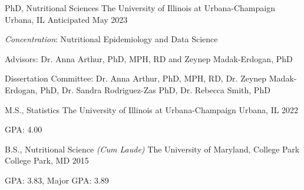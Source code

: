 

\begin{cventries}

  \cventry
    {PhD, Nutritional Sciences} %
    {The University of Illinois at Urbana-Champaign} %
    {Urbana, IL} %
    {Anticipated May 2023} %
    {
      \begin{cvitems} %
        \item {\textit{Concentration}: Nutritional Epidemiology and Data Science}
         \item {Advisors: Dr. Anna Arthur, PhD, MPH, RD and Zeynep Madak-Erdogan, PhD}
         \item{Dissertation Committee: Dr. Anna Arthur, PhD, MPH, RD, Dr. Zeynep Madak-Erdogan, PhD, Dr. Sandra Rodriguez-Zas PhD, Dr. Rebecca Smith, PhD}
      \end{cvitems}
    }


  \cventry
    {M.S., Statistics} %
    {The University of Illinois at Urbana-Champaign} %
    {Urbana, IL} %
    {2022} %
    {
      \begin{cvitems} %
        \item {GPA: 4.00}
      \end{cvitems}
    }


  \cventry
    {B.S., Nutritional Science \textit{(Cum Laude)}} %
    {The University of Maryland, College Park} %
    {College Park, MD} %
    {2015} %
    {
      \begin{cvitems} %
        \item {GPA: 3.83, Major GPA: 3.89}
      \end{cvitems}
    }

\end{cventries}
